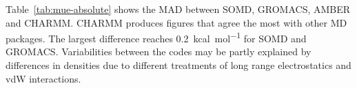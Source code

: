\documentclass[journal=jctcce,manuscript=article]{achemso}
\begin{document}

Table~\ref{tab:mue-absolute} shows the MAD between SOMD, GROMACS, AMBER and CHARMM. {\color{blue} CHARMM produces figures that agree the most with other MD packages. The largest difference reaches \SI{0.2}{kcal.mol^{-1}} for SOMD and GROMACS. Variabilities between the codes may be partly explained by differences in densities due to different treatments of long range electrostatics and vdW interactions.}
\end{document}
